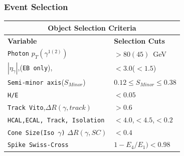 \documentclass{beamer}
\begin{document}
\begin{frame}
\frametitle{Event Selection}
\begin{minipage}[b]{0.45\linewidth}
\centering
\small{
\begin{tabular}[2cm]{l l}
\multicolumn{2}{c}{\bfseries{Object Selection Criteria}} \\
  \hline 
  \bfseries{Variable} & \bfseries{Selection Cuts} \\
   \hline 
  \texttt{Photon} $p_{T}(\gamma^{1(2)})$  & $ > 80(45)$~GeV \\
 $|\eta_{\gamma}|$,(\texttt{EB only}),  &$ < 3.0$($ < 1.5$) \\
 \texttt{Semi-minor axis}($S_{Minor}$)  &$0.12 \leq S_{Minor} \leq 0.38$ \\
 \texttt{H/E}  & $ < 0.05$ \\
 \texttt{Track Vito},$\Delta R(\gamma, track)$  & $ > 0.6 $ \\
 \texttt{HCAL,ECAL, Track, Isolation}  & $ < 4.0 $,$ < 4.5 $,$ < 0.2 $ \\
 \texttt{Cone Size(Iso $\gamma$)} $\Delta R(\gamma, SC)$ & $< 0.4$ \\
 \texttt{Spike Swiss-Cross} & $1-E_{4}/E_{1})< 0.98$ \\ 


\end{tabular}}
\end{minipage}
\end{frame}
\end{document}
